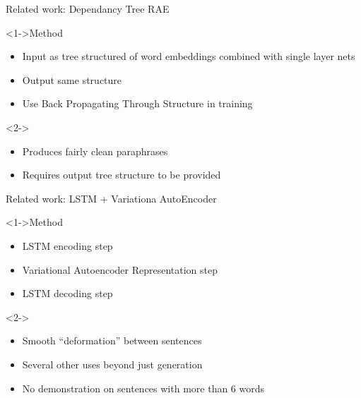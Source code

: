 \documentclass[]{beamer}
\begin{document}


\begin{frame}{Related work: Dependancy Tree RAE}
	\begin{block}<1->{Method}
		\begin{itemize}
			\item Input as tree structured of word embeddings combined with single layer nets
			\item Output same structure
			\item Use Back Propagating Through Structure in training
		\end{itemize}
	\end{block}
	\begin{block}<2->{}
		\begin{itemize}
			\item Produces fairly clean paraphrases 
			\item Requires output tree structure to be provided
		\end{itemize}
	\end{block}
\end{frame}



\begin{frame}{Related work: LSTM + Variationa AutoEncoder}
	\begin{block}<1->{Method}
			\begin{itemize}
				\item LSTM encoding step
				\item Variational Autoencoder Representation step
				\item LSTM decoding step
			\end{itemize}
	\end{block}
	\begin{block}<2->{}
		\begin{itemize}
			\item Smooth ``deformation'' between sentences
			\item Several other uses beyond just generation
			\item No demonstration on sentences with more than 6 words
		\end{itemize}
	\end{block}
\end{frame}

\end{document}
